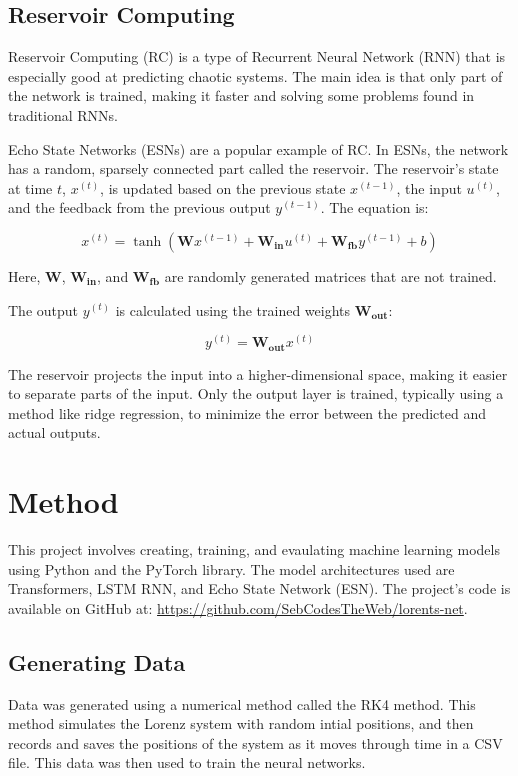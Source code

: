 \documentclass[11pt]{article}
\begin{document}
\subsection{Reservoir Computing}
Reservoir Computing (RC) is a type of Recurrent Neural Network (RNN) that is especially good at predicting chaotic systems. The main idea is that only part of the network is trained, making it faster and solving some problems found in traditional RNNs.

Echo State Networks (ESNs) are a popular example of RC. In ESNs, the network has a random, sparsely connected part called the reservoir. The reservoir's state at time $t$, $x^{(t)}$, is updated based on the previous state $x^{(t-1)}$, the input $u^{(t)}$, and the feedback from the previous output $y^{(t-1)}$. The equation is:

\[
x^{(t)} = \tanh(\mathbf{W}x^{(t-1)} + \mathbf{W_{in}}u^{(t)} + \mathbf{W_{fb}}y^{(t-1)} + b)
\]

Here, $\mathbf{W}$, $\mathbf{W_{in}}$, and $\mathbf{W_{fb}}$ are randomly generated matrices that are not trained.

The output $y^{(t)}$ is calculated using the trained weights $\mathbf{W_{out}}$:

\[
y^{(t)} = \mathbf{W_{out}}x^{(t)}
\]

The reservoir projects the input into a higher-dimensional space, making it easier to separate parts of the input. Only the output layer is trained, typically using a method like ridge regression, to minimize the error between the predicted and actual outputs.


\section{Method}
This project involves creating, training, and evaulating machine learning models using Python and the PyTorch library. The model architectures used are Transformers, LSTM RNN, and Echo State Network (ESN). The project's code is available on GitHub at: \url{https://github.com/SebCodesTheWeb/lorents-net}.

\subsection{Generating Data}

Data was generated using a numerical method called the RK4 method. This method simulates the Lorenz system with random intial positions, and then records and saves the positions of the system as it moves through time in a CSV file. This data was then used to train the neural networks.
\end{document}
